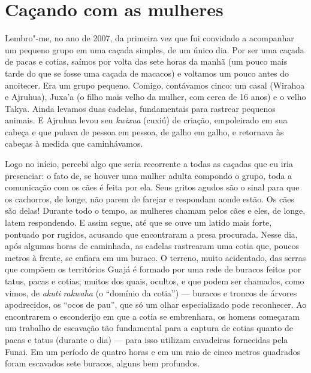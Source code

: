 \section{Caçando com as mulheres}

Lembro"-me, no ano de 2007, da primeira vez que fui convidado a
acompanhar um pequeno grupo em uma caçada simples, de um único dia. Por
ser uma caçada de pacas e cotias, saímos por volta das sete horas da
manhã (um pouco mais tarde do que se fosse uma caçada de macacos) e
voltamos um pouco antes do anoitecer. Era um grupo pequeno. Comigo,
contávamos cinco: um casal (Wirahoa e Ajruhua), Juxa'a (o filho mais
velho da mulher, com cerca de 16 anos) e o velho Takya. Ainda levamos
duas cadelas, fundamentais para rastrear pequenos animais. E Ajruhua
levou seu \emph{kwixua} (cuxiú) de criação, empoleirado em sua cabeça e
que pulava de pessoa em pessoa, de galho em galho, e retornava às
cabeças à medida que caminhávamos.

Logo no início, percebi algo que seria recorrente a todas as caçadas que
eu iria presenciar: o fato de, se houver uma mulher adulta compondo o
grupo, toda a comunicação com os cães é feita por ela. Seus gritos
agudos são o sinal para que os cachorros, de longe, não parem de farejar
e respondam aonde estão. Os cães são delas! Durante todo o tempo, as
mulheres chamam pelos cães e eles, de longe, latem respondendo. E assim
segue, até que se ouve um latido mais forte, pontuado por rugidos,
acusando que encontraram a presa procurada. Nesse dia, após algumas
horas de caminhada, as cadelas rastrearam uma cotia que, poucos metros à
frente, se enfiara em um buraco. O terreno, muito acidentado, das serras
que compõem os territórios Guajá é formado por uma rede de buracos
feitos por tatus, pacas e cotias; muitos dos quais, ocultos, e que podem
ser chamados, como vimos, de \emph{akuti} \emph{rakwaha} (o ``domínio da
cotia'') --- buracos e troncos de árvores apodrecidos, os ``ocos de pau'',
que só um olhar especializado pode reconhecer. Ao encontrarem o
esconderijo em que a cotia se embrenhara, os homens começaram um
trabalho de escavação tão fundamental para a captura de cotias quanto de
pacas e tatus (durante o dia) --- para isso utilizam cavadeiras fornecidas
pela Funai. Em um período de quatro horas e em um raio de cinco metros
quadrados foram escavados sete buracos, alguns bem profundos.


